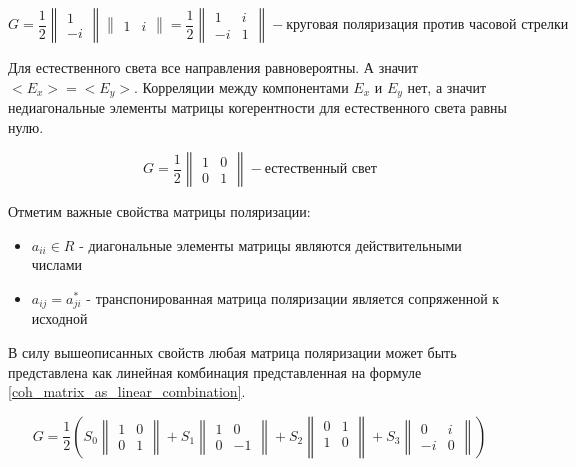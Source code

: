 \documentclass[a4paper]{article}
\begin{document}
\begin{equation}
G = \frac{1}{2} \begin{Vmatrix} 1 \\ -i \end{Vmatrix} \begin{Vmatrix} 1 & i \end{Vmatrix} = \frac{1}{2}  \begin{Vmatrix} 1 & i\\ -i & 1 \end{Vmatrix} - 
\text{круговая поляризация против часовой стрелки}
\label{circ_polarized_coh_matrix}
 \end{equation}

Для естественного света все направления равновероятны. А значит $ <E_{x}> =  <E_{y}> $. Корреляции между компонентами $E_{x}$ и $E_y$ нет, а значит недиагональные элементы матрицы когерентности для естественного света равны нулю.

\begin{equation}
G = \frac{1}{2} \begin{Vmatrix}
    1 & 0 \\
    0 & 1 
\end{Vmatrix}
- \text{естественный свет}
\end{equation}

Отметим важные свойства матрицы поляризации:
\begin{itemize}
    \item $a_{ii} \in R$ - диагональные элементы матрицы являются действительными числами
    \item $a_{ij} = a_{ji}^{*}$ - транспонированная матрица поляризации является сопряженной к исходной
\end{itemize}

В силу вышеописанных свойств любая матрица поляризации может быть представлена как линейная комбинация представленная на формуле \ref{coh_matrix_as_linear_combination}.

\begin{equation}
\boxed{
    G =   
    \frac{1}{2}
    \left(
    S_{0}
    \begin{Vmatrix}
        1 & 0 \\
        0 & 1
    \end{Vmatrix}
    +
    S_{1} \begin{Vmatrix}
        1 & 0 \\
        0 & -1
    \end{Vmatrix}
    + 
    S_{2} \begin{Vmatrix}
        0 & 1 \\
        1 & 0 \\
    \end{Vmatrix}
    +
    S_{3} \begin{Vmatrix}
        0 & i \\
        -i & 0 
    \end{Vmatrix}
    \right)
    }
    \label{coh_matrix_as_linear_combination}
\end{equation}
\end{document}
